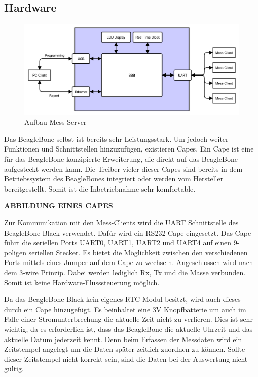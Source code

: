 \subsection{Hardware}
\label{ServerHardware}

\begin{figure}[H]
\begin{center}
\includegraphics[width=\textwidth ]{img/general/UebersichtMaster.pdf}
\caption{Aufbau Mess-Server}
\label{figure_AufbauBleagleBone}
\end{center}
\end{figure}

Das BeagleBone selbst ist bereits sehr Leistungsstark. Um jedoch weiter Funktionen und Schnittstellen hinzuzufügen, existieren Capes. Ein Cape ist eine für das BeagleBone konzipierte Erweiterung, die direkt auf das BeagleBone aufgesteckt werden kann. Die Treiber vieler dieser Capes sind bereits in dem Betriebssystem des BeagleBones integriert oder werden vom Hersteller bereitgestellt. Somit ist die Inbetriebnahme sehr komfortable.


\textbf{ABBILDUNG EINES CAPES}


Zur Kommunikation mit den Mess-Clients wird die \ac{UART} Schnittstelle des BeagleBone Black verwendet. Dafür wird ein RS232 Cape eingesetzt. Das Cape führt die seriellen Ports UART0, UART1, UART2 und UART4 auf einen 9-poligen seriellen Stecker. Es bietet die Möglichkeit zwischen den verschiedenen Ports mittels eines Jumper auf dem Cape zu wechseln. Angeschlossen wird nach dem 3-wire Prinzip. Dabei werden lediglich Rx, Tx und die Masse verbunden. Somit ist keine Hardware-Flusssteuerung möglich.\ 

Da das BeagleBone Black kein eigenes \ac{RTC} Modul besitzt, wird auch dieses durch ein Cape hinzugefügt. Es beinhaltet eine 3V Knopfbatterie um auch im Falle einer Stromunterbrechung die aktuelle Zeit nicht zu verlieren. Dies ist sehr wichtig, da es erforderlich ist, dass das BeagleBone die aktuelle Uhrzeit und das aktuelle Datum jederzeit kennt. Denn beim Erfassen der Messdaten wird ein Zeitstempel angelegt um die Daten später zeitlich zuordnen zu können. Sollte dieser Zeitstempel nicht korrekt sein, sind die Daten bei der Auswertung nicht gültig.\ 

